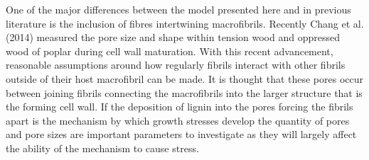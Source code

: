 One of the major differences between the model presented here and in previous
literature is the inclusion of fibres intertwining macrofibrils. Recently Chang
et al. (2014) measured the pore size and shape within tension wood and oppressed
wood of poplar during cell wall maturation. With this recent advancement,
reasonable assumptions around how regularly fibrils interact with other fibrils
outside of their host macrofibril can be made. It is thought that these pores
occur between joining fibrils connecting the macrofibrils into the larger
structure that is the forming cell wall. If the deposition of lignin into the
pores forcing the fibrils apart is the mechanism by which growth stresses
develop the quantity of pores and pore sizes are important parameters to
investigate as they will largely affect the ability of the mechanism to cause
stress.